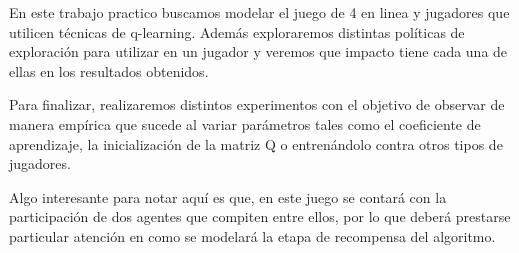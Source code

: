 En este trabajo practico buscamos modelar el juego de 4 en linea y jugadores que utilicen técnicas de q-learning. Además exploraremos distintas políticas de exploración para utilizar en un jugador y veremos que impacto tiene cada una de ellas en los resultados obtenidos. 

Para finalizar, realizaremos distintos experimentos con el objetivo de observar de manera empírica que sucede al variar parámetros tales como el coeficiente de aprendizaje, la inicialización de la matriz Q o entrenándolo contra otros tipos de jugadores.

Algo interesante para notar aquí es que, en este juego se contará con la participación de dos agentes que compiten entre ellos, por lo que deberá prestarse particular atención en como se modelará la etapa de recompensa del algoritmo.